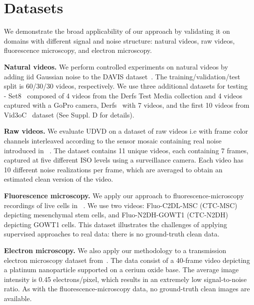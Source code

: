 \documentclass[final]{cvpr}
\begin{document}
\section{Datasets}
\label{sec:datasets}
We demonstrate the broad applicability of our approach by validating it on domains with different signal and noise structure: natural videos, raw videos, fluorescence microscopy, and electron microscopy. 

\noindent\textbf{Natural videos.} We perform controlled experiments on natural videos by adding iid Gaussian noise to the DAVIS dataset~\cite{davis}. The training/validation/test split is 60/30/30 videos, respectively. We use three additional datasets for testing - Set8~\cite{fastdvdnet} composed of 4 videos from the Derfs Test Media collection and 4 videos captured with a GoPro camera, Derfs~\cite{mf2f} with 7 videos, and the first 10 videos from Vid3oC~\cite{vid3oc} dataset (See Suppl. D for details).

\noindent\textbf{Raw videos.} We evaluate UDVD on a dataset of raw videos i.e with frame color channels interleaved according to the sensor mosaic containing real noise introduced in ~\cite{rawvideo}. The dataset contains 11 unique videos, each containing 7 frames, captured at five different ISO levels using a surveillance camera. Each video has 10 different noise realizations per frame, which are averaged to obtain an estimated clean version of the video. 

 
\noindent\textbf{Fluorescence microscopy.} We apply our approach to fluorescence-microscopy recordings of live cells in ~\cite{celltrack}. We use two videos: Fluo-C2DL-MSC (CTC-MSC) depicting mesenchymal stem cells, and Fluo-N2DH-GOWT1 (CTC-N2DH) depicting GOWT1 cells. This dataset illustrates the challenges of applying supervised approaches to real data: there is no ground-truth clean data.

\noindent\textbf{Electron microscopy.} We also apply our methodology to a transmission electron microscopy dataset from~\cite{mohan2020deep}. The data consist of a 40-frame video depicting a platinum nanoparticle supported on a cerium oxide base. The average image intensity is 0.45 electrons/pixel, which results in an extremely low signal-to-noise ratio. As with the fluorescence-microscopy data, no ground-truth clean images are available.
\end{document}
